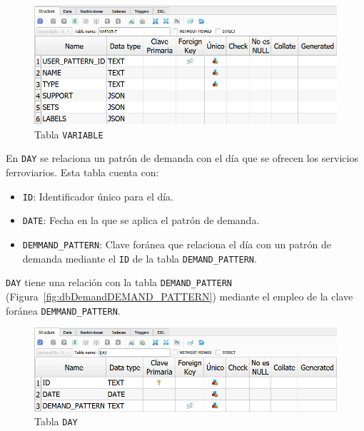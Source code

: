 \begin{figure}[H]
\centering
\includegraphics[width=.9\textwidth]{fig/Tablas base de datos/Demanda/VARIABLE.png}
\caption{Tabla \texttt{VARIABLE}}
\label{fig:dbDemandVARIABLE}
\end{figure}

En \texttt{DAY} se relaciona un patrón de demanda con el día que se ofrecen los servicios ferroviarios. Esta tabla cuenta con:
\begin{itemize}
    \item \texttt{ID}: Identificador único para el día.
    \item \texttt{DATE}: Fecha en la que se aplica el patrón de demanda.
    \item \texttt{DEMMAND\_PATTERN}: Clave foránea que relaciona el día con un patrón de demanda mediante el \texttt{ID} de la tabla \texttt{DEMAND\_PATTERN}.
\end{itemize}
\texttt{DAY} tiene una relación con la tabla \texttt{DEMAND\_PATTERN} (Figura~\ref{fig:dbDemandDEMAND_PATTERN}) mediante el empleo de la clave foránea \texttt{DEMMAND\_PATTERN}.

\begin{figure}[H]
\centering
\includegraphics[width=.9\textwidth]{fig/Tablas base de datos/Demanda/DAY.png}
\caption{Tabla \texttt{DAY}}
\label{fig:dbDemandDAY}
\end{figure}

